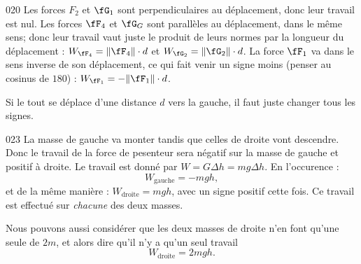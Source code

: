 \documentclass{article}
\begin{document}
\begin{corrige}{020}
Les forces $F_2$ et $\fG_1$ sont perpendiculaires au déplacement, donc leur travail est nul. Les forces $\fF_4$ et $\fG_G$ sont parallèles au déplacement, dans le même sens; donc leur travail vaut juste le produit de leurs normes par la longueur du déplacement : $W_{\fF_4}=\| \fF_4 \|\cdot d$ et $W_{\fG_2}=\| \fG_2 \|\cdot d$. La force $\fF_1$ va dans le sens inverse de son déplacement, ce qui fait venir un signe moins (penser au cosinus de $180$) : $W_{\fF_1}=-\| \fF_1 \|\cdot d$.

Si le tout se déplace d'une distance $d$ vers la gauche, il faut juste changer tous les signes.
\end{corrige}
\begin{corrige}{023}
La masse  de gauche va monter tandis que celles de droite vont descendre. Donc le travail de la force de pesenteur sera négatif sur la masse de gauche et positif à droite. Le travail est donné par $W=G\Delta h=mg\Delta h$. En l'occurence :
\[ 
 W_{\text{gauche}}=-mgh,
\]
et de la même manière : $W_{\text{droite}}=mgh$, avec un signe positif cette fois. Ce travail est effectué sur \emph{chacune} des deux masses. 

Nous pouvons aussi considérer que les deux masses de droite n'en font qu'une seule de $2m$, et alors dire qu'il n'y a qu'un seul travail 
\[
W_{\text{droite}}=2mgh.
\]
\end{corrige}
\end{document}
